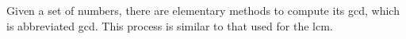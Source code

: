 \documentclass{article}
\begin{document}
Given a set of numbers, there are elementary methods to compute 
its \acrlong{gcd}, which is abbreviated \acrshort{gcd}. This process 
is similar to that used for the \acrfull{lcm}.
 
\clearpage
 
\printglossary[type=\acronymtype]
 
\end{document}

